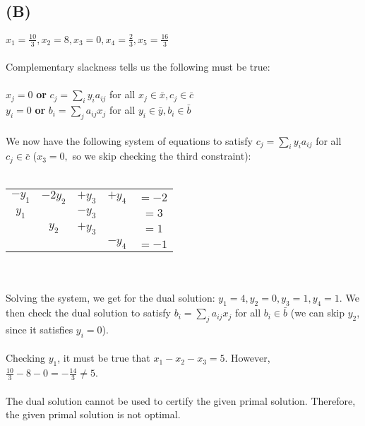 \documentclass[12pt]{article}
\begin{document}
\subsection*{(B)}
$x_1 = \frac{10}{3}, x_2 = 8, x_3 = 0, x_4 = \frac{2}{3}, x_5 = \frac{16}{3}$ \\
\\
Complementary slackness tells us the following must be true: \\
\\
$x_j = 0$ \textbf{ or } $c_j = \sum_i y_i a_{ij}$ for all $x_j \in \bar{x}, c_j \in \bar{c}$ \\
$y_i = 0$ \textbf{ or } $b_i = \sum_j a_{ij} x_j$ for all $y_i \in \bar{y}, b_i \in \bar{b}$ \\
\\
We now have the following system of equations to satisfy $c_j = \sum_i y_i a_{ij}$ for all $c_j \in \bar{c}$ ($x_3 = 0,$ so we skip checking the third constraint): \\
\\
\begin{tabular}{c c c c c}
    $-y_1$ & $-2y_2$ & $+y_3$ & $+y_4$ & $= -2$ \\
    $y_1$ & & $-y_3$ & & $= 3$ \\
    & $y_2$ & $+y_3$ & & $= 1$ \\
    & & & $-y_4$ & $= -1$
\end{tabular} \\
\\
Solving the system, we get for the dual solution: $y_1=4, y_2=0, y_3=1, y_4=1$. We then check the dual solution to satisfy $b_i = \sum_j a_{ij} x_j$ for all $b_i \in \bar{b}$ (we can skip $y_2$, since it satisfies $y_i = 0$). \\
\\
Checking $y_1$, it must be true that $x_1 - x_2 - x_3 = 5$. However, $\frac{10}{3} - 8 - 0 = -\frac{14}{3} \neq 5$. \\
\\
The dual solution cannot be used to certify the given primal solution. Therefore, the given primal solution is not optimal.

\newpage
\end{document}

